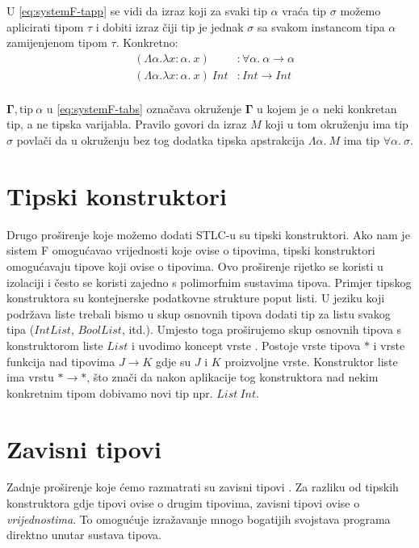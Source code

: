 \documentclass[diplomskirad,upload]{fer}
\begin{document}
U \ref{eq:systemF-tapp} se vidi da izraz koji za svaki tip \(\alpha\) vraća tip
\(\sigma\) možemo aplicirati tipom \(\tau\) i dobiti izraz čiji tip je jednak
\(\sigma\) sa svakom instancom tipa \(\alpha\) zamijenjenom tipom \(\tau\). Konkretno:
\begin{align*}
    &(\Lambda \alpha. \lambda x : \alpha.\ x) & : \forall \alpha.\ \alpha \to \alpha \\
    &(\Lambda \alpha. \lambda x : \alpha.\ x)\ Int & : Int \to Int \\
\end{align*}

\(\mathbf{\Gamma}, \text{tip}\ \alpha\) u \ref{eq:systemF-tabs} označava okruženje
\(\mathbf{\Gamma}\) u kojem je \(\alpha\) neki konkretan tip, a ne tipska
varijabla. Pravilo govori da izraz \(M\) koji u tom okruženju ima tip \(\sigma\)
povlači da u okruženju bez tog dodatka tipska apstrakcija \(\Lambda \alpha.\ M\)
ima tip \(\forall \alpha.\ \sigma\).

\section{Tipski konstruktori}

Drugo proširenje koje možemo dodati STLC-u su tipski konstruktori. Ako nam je
sistem F omogućavao vrijednosti koje ovise o tipovima, tipski konstruktori
omogućavaju tipove koji ovise o tipovima. Ovo proširenje rijetko se koristi u
izolaciji i često se koristi zajedno s polimorfnim sustavima tipova. Primjer
tipskog konstruktora su kontejnerske podatkovne strukture poput listi. U jeziku
koji podržava liste trebali bismo u skup osnovnih tipova dodati tip za listu
svakog tipa (\(IntList\), \(BoolList\), itd.). Umjesto toga proširujemo skup
osnovnih tipova s konstruktorom liste \(List\) i uvodimo koncept vrste . Postoje
vrste tipova \(*\) i vrste funkcija nad tipovima \(J \to K\) gdje su \(J\) i
\(K\) proizvoljne vrste. Konstruktor liste ima vrstu \(* \to *\), što znači da
nakon aplikacije tog konstruktora nad nekim konkretnim tipom dobivamo novi tip
npr. \(List\ Int\).

\section{Zavisni tipovi}

Zadnje proširenje koje ćemo razmatrati su zavisni tipovi . Za razliku od tipskih konstruktora gdje tipovi ovise o drugim tipovima,
zavisni tipovi ovise o \emph{vrijednostima}. To omogućuje izražavanje mnogo
bogatijih svojstava programa direktno unutar sustava tipova.
\end{document}
